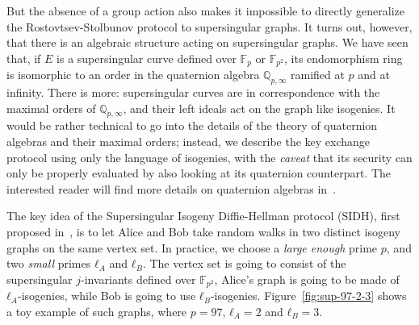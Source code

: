 \documentclass[10pt]{article}
\theoremstyle{plain}
\theoremstyle{definition}
\def\F{\ensuremath{\mathbb{F}}}
\begin{document}
But the absence of a group action also makes it impossible to directly
generalize the Rostovtsev-Stolbunov protocol to supersingular
graphs. %
It turns out, however, that there is an algebraic structure acting on
supersingular graphs. %
We have seen that, if $E$ is a supersingular curve defined over $\F_p$
or $\F_{p^2}$, its endomorphism ring is isomorphic to an order in the
quaternion algebra $ℚ_{p,∞}$ ramified at $p$ and at infinity. %
There is more: supersingular curves are in correspondence with the
maximal orders of $ℚ_{p,∞}$, and their left ideals act on the graph
like isogenies. %
It would be rather technical to go into the details of the theory of
quaternion algebras and their maximal orders; instead, we describe the
key exchange protocol using only the language of isogenies, with the
\emph{caveat} that its security can only be properly evaluated by
also looking at its quaternion counterpart. %
The interested reader will find more details on quaternion algebras
in~\cite{waterhouse69,pizer1,pizer2,kohel,belding08-thesis,kohel2014quaternion}.

The key idea of the Supersingular Isogeny Diffie-Hellman protocol
(SIDH), first proposed in~\cite{jao+defeo2011}, is to let Alice and
Bob take random walks in two distinct isogeny graphs on the same
vertex set. %
In practice, we choose a \emph{large enough} prime $p$, and two
\emph{small} primes $ℓ_A$ and $ℓ_B$. %
The vertex set is going to consist of the supersingular $j$-invariants
defined over $\F_{p^2}$, Alice's graph is going to be made of
$ℓ_A$-isogenies, while Bob is going to use $ℓ_B$-isogenies. %
Figure~\ref{fig:sup-97-2-3} shows a toy example of such graphs, where
$p=97$, $ℓ_A=2$ and $ℓ_B=3$.
\end{document}
